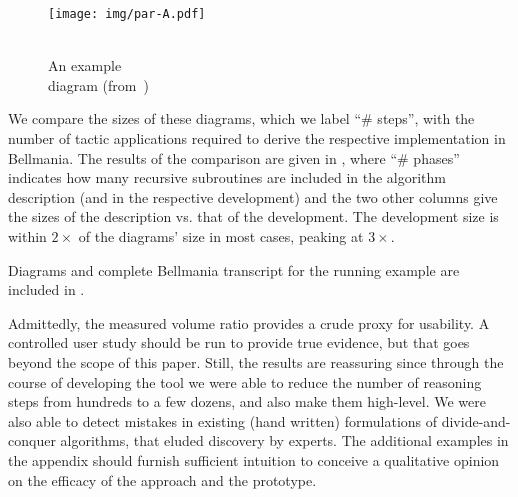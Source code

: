\setlength{\columnsep}{3mm}%
\setlength{\intextsep}{3mm}
%
\begin{wrapfigure}{r}{2.8cm}
\texttt{[image: img/par-A.pdf]}
\caption[An example diagram]{\label{evaluation:par-A-diag}\\
  An example \\diagram (from~\cite{PPoPP16/Chowdhury})}
\end{wrapfigure}
%

\cbstart{}%
We compare the sizes of these diagrams, which we label ``\# steps'', with the number of tactic
applications required to derive the respective implementation in Bellmania.
The results of the comparison are given in , where ``\# phases''
indicates how many recursive subroutines are included in the algorithm description 
(and in the respective development) and the two other columns give the sizes of the description vs. that of the development.
The development size is within $2\times$ of the diagrams' size in most cases, peaking at $3\times$.

Diagrams and complete Bellmania transcript for the running example are included in .

Admittedly, the measured volume ratio provides a crude proxy for usability.
A controlled user study should be run to provide true evidence,
but that goes beyond the scope of this paper.
Still, the results are reassuring since through the course of developing the
tool we were able to reduce the number of reasoning steps from hundreds to
a few dozens, and also make them high-level.
We were also able to detect mistakes in existing (hand written) formulations
of divide-and-conquer algorithms, that eluded discovery by experts.
The additional examples in the appendix
should furnish sufficient intuition to conceive a qualitative opinion on
the efficacy of the approach and the prototype.
\cbend

